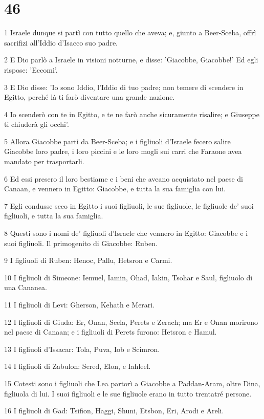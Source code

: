 \chapter{46}

\par 1 Israele dunque si partì con tutto quello che aveva; e, giunto a Beer-Sceba, offrì sacrifizi all'Iddio d'Isacco suo padre.
\par 2 E Dio parlò a Israele in visioni notturne, e disse: 'Giacobbe, Giacobbe!' Ed egli rispose: 'Eccomi'.
\par 3 E Dio disse: 'Io sono Iddio, l'Iddio di tuo padre; non temere di scendere in Egitto, perché là ti farò diventare una grande nazione.
\par 4 Io scenderò con te in Egitto, e te ne farò anche sicuramente risalire; e Giuseppe ti chiuderà gli occhi'.
\par 5 Allora Giacobbe partì da Beer-Sceba; e i figliuoli d'Israele fecero salire Giacobbe loro padre, i loro piccini e le loro mogli sui carri che Faraone avea mandato per trasportarli.
\par 6 Ed essi presero il loro bestiame e i beni che aveano acquistato nel paese di Canaan, e vennero in Egitto: Giacobbe, e tutta la sua famiglia con lui.
\par 7 Egli condusse seco in Egitto i suoi figliuoli, le sue figliuole, le figliuole de' suoi figliuoli, e tutta la sua famiglia.
\par 8 Questi sono i nomi de' figliuoli d'Israele che vennero in Egitto: Giacobbe e i suoi figliuoli. Il primogenito di Giacobbe: Ruben.
\par 9 I figliuoli di Ruben: Henoc, Pallu, Hetsron e Carmi.
\par 10 I figliuoli di Simeone: Iemuel, Iamin, Ohad, Iakin, Tsohar e Saul, figliuolo di una Cananea.
\par 11 I figliuoli di Levi: Gherson, Kehath e Merari.
\par 12 I figliuoli di Giuda: Er, Onan, Scela, Perets e Zerach; ma Er e Onan morirono nel paese di Canaan; e i figliuoli di Perets furono: Hetsron e Hamul.
\par 13 I figliuoli d'Issacar: Tola, Puva, Iob e Scimron.
\par 14 I figliuoli di Zabulon: Sered, Elon, e Iahleel.
\par 15 Cotesti sono i figliuoli che Lea partorì a Giacobbe a Paddan-Aram, oltre Dina, figliuola di lui. I suoi figliuoli e le sue figliuole erano in tutto trentatré persone.
\par 16 I figliuoli di Gad: Tsifion, Haggi, Shuni, Etsbon, Eri, Arodi e Areli.
